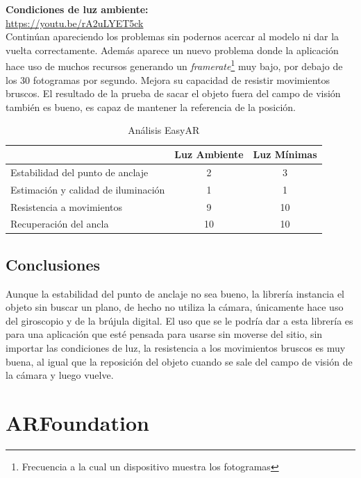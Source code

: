 \textbf{Condiciones de luz ambiente:}\\
\url{https://youtu.be/rA2uLYET5ck}\\

Continúan apareciendo los problemas sin podernos acercar al modelo ni dar la vuelta correctamente. Además aparece un nuevo problema donde la aplicación hace uso de muchos recursos generando un \textit{framerate}\footnote{Frecuencia a la cual un dispositivo muestra los fotogramas} muy bajo, por debajo de los 30 fotogramas por segundo. Mejora su capacidad de resistir movimientos bruscos. El resultado de la prueba de sacar el objeto fuera del campo de visión también es bueno, es capaz de mantener la referencia de la posición.

\begin{table}[H]
    \centering
    \begin{tabular}{l c c}
    \toprule
          & Luz Ambiente & Luz Mínimas \\
         \midrule
        Estabilidad del punto de anclaje   &2 &3\\
        
        Estimación y calidad de iluminación  &1 &1 \\
        
        Resistencia a movimientos  &9 &10 \\
        
        Recuperación del ancla  &10 &10 \\
      \bottomrule
    \end{tabular}
    \caption{Análisis EasyAR}
    \label{tab:EasyAR}
\end{table}
\subsection{Conclusiones}
Aunque la estabilidad del punto de anclaje no sea bueno, la librería instancia el objeto sin buscar un plano, de hecho no utiliza la cámara, únicamente hace uso del giroscopio y de la brújula digital. El uso que se le podría dar a esta librería es para una aplicación que esté pensada para usarse sin moverse del sitio, sin importar las condiciones de luz, la resistencia a los movimientos bruscos es muy buena, al igual que la reposición del objeto cuando se sale del campo de visión de la cámara y luego vuelve.

\section{ARFoundation}
